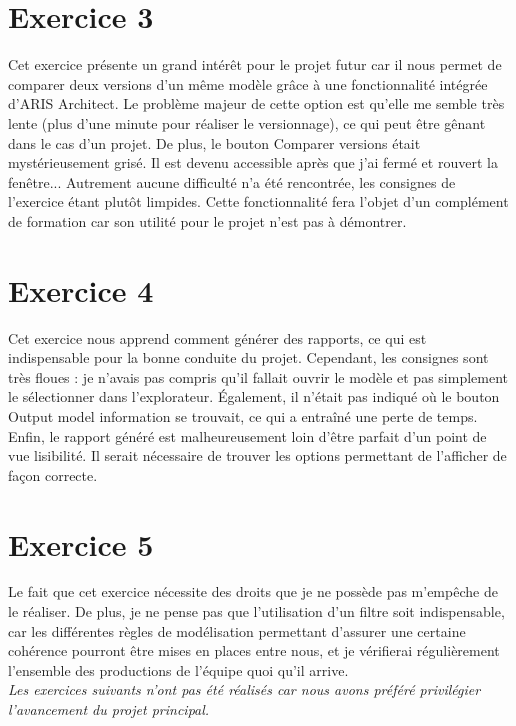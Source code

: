 \section{Exercice 3}
    
Cet exercice présente un grand intérêt pour le projet futur car il nous permet de comparer deux versions d’un même modèle grâce à une fonctionnalité intégrée d’ARIS Architect. Le problème majeur de cette option est qu’elle me semble très lente (plus d’une minute pour réaliser le versionnage), ce qui peut être gênant dans le cas d’un projet. De plus, le bouton \og{}Comparer versions\fg{} était mystérieusement grisé. Il est devenu accessible après que j'ai fermé et rouvert la fenêtre... \newline
Autrement aucune difficulté n'a été rencontrée, les consignes de l’exercice étant plutôt limpides. Cette fonctionnalité fera l’objet d'un complément de formation car son utilité pour le projet n'est pas à démontrer.

\section{Exercice 4}

Cet exercice nous apprend comment générer des rapports, ce qui est indispensable pour la bonne conduite du projet. Cependant, les consignes sont très floues : je n’avais pas compris qu’il fallait ouvrir le modèle et pas simplement le sélectionner dans l’explorateur. \'Egalement, il n’était pas indiqué où le bouton \og{}Output model information\fg{} se trouvait, ce qui a entraîné une perte de temps. Enfin, le rapport généré est malheureusement loin d’être parfait d’un point de vue lisibilité. Il serait nécessaire de trouver les options permettant de l’afficher de façon correcte.

\section{Exercice 5}

Le fait que cet exercice nécessite des droits que je ne possède pas m’empêche de le réaliser. De plus, je ne pense pas que l’utilisation d’un filtre soit indispensable, car les différentes règles de modélisation permettant d’assurer une certaine cohérence pourront être mises en places entre nous, et je vérifierai régulièrement l’ensemble des productions de l’équipe quoi qu’il arrive. \\

\it{Les exercices suivants n’ont pas été réalisés car nous avons préféré privilégier l’avancement du projet principal.}

